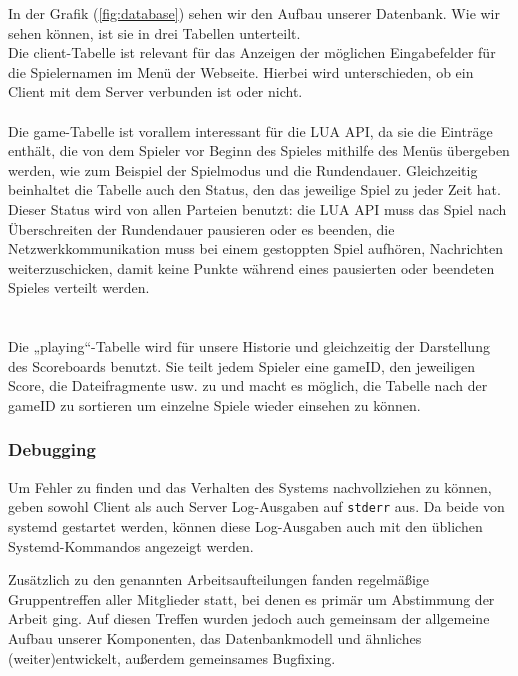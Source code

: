 In der Grafik (\cref{fig:database}) sehen wir den Aufbau unserer Datenbank. Wie wir sehen können, ist sie in drei Tabellen unterteilt.\\
Die client-Tabelle ist relevant für das Anzeigen der möglichen Eingabefelder für die Spielernamen im Menü der Webseite. Hierbei wird unterschieden, ob ein Client mit dem Server verbunden ist oder nicht.\\\\
Die game-Tabelle ist vorallem interessant für die LUA API, da sie die Einträge enthält, die von dem Spieler vor Beginn des Spieles mithilfe des Menüs übergeben werden, wie zum Beispiel der Spielmodus und die Rundendauer. Gleichzeitig beinhaltet die Tabelle auch den Status, den das jeweilige Spiel zu jeder Zeit hat. Dieser Status wird von allen Parteien benutzt: die LUA API muss das Spiel nach Überschreiten der Rundendauer pausieren oder es beenden, die Netzwerkkommunikation muss bei einem gestoppten Spiel aufhören, Nachrichten weiterzuschicken, damit keine Punkte während eines pausierten oder beendeten Spieles verteilt werden.\\\\\\
Die „playing“-Tabelle wird für unsere Historie und gleichzeitig der Darstellung des Scoreboards benutzt. Sie teilt jedem Spieler eine gameID, den jeweiligen Score, die Dateifragmente usw. zu und macht es möglich, die Tabelle nach der gameID zu sortieren um einzelne Spiele wieder einsehen zu können.

\subsubsection{Debugging}

Um Fehler zu finden und das Verhalten des Systems nachvollziehen zu können, geben sowohl Client als auch Server Log-Ausgaben auf \texttt{stderr} aus. Da beide von systemd gestartet werden, können diese Log-Ausgaben auch mit den üblichen Systemd-Kommandos angezeigt werden.\newline

Zusätzlich zu den genannten Arbeitsaufteilungen fanden regelmäßige Gruppentreffen aller Mitglieder statt, bei denen es primär um Abstimmung der Arbeit ging. Auf diesen Treffen wurden jedoch auch gemeinsam der allgemeine Aufbau unserer Komponenten, das Datenbankmodell und ähnliches (weiter)entwickelt, außerdem gemeinsames Bugfixing.

